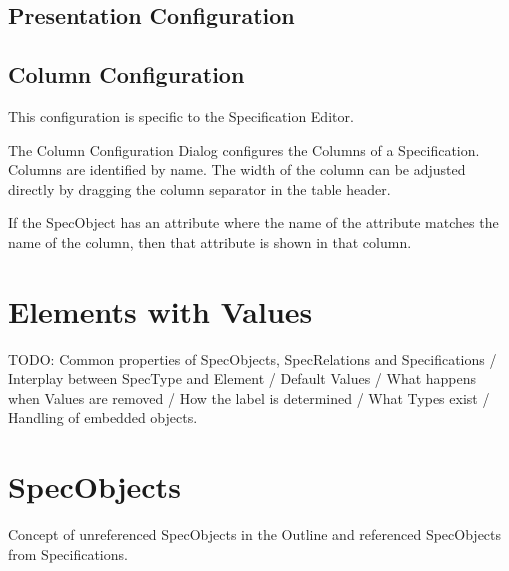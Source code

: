 \subsection{Presentation Configuration}
\label{sec:presentation_configuration}

\subsection{Column Configuration}
\label{sec:column_configuration}

This configuration is specific to the Specification Editor.

The Column Configuration Dialog configures the Columns of a
Specification.  Columns are identified by name.  The width of the column
can be adjusted directly by dragging the column separator in the table
header.

If the SpecObject has an attribute where the name of the attribute
matches the name of the column, then that attribute is shown in that
column.

\section{Elements with Values}

TODO: Common properties of SpecObjects, SpecRelations and Specifications / Interplay between SpecType and Element / Default Values / What happens when Values are removed / How the label is determined / What Types exist / Handling of embedded objects.

\section{SpecObjects}

Concept of unreferenced SpecObjects in the Outline and referenced SpecObjects from Specifications.

